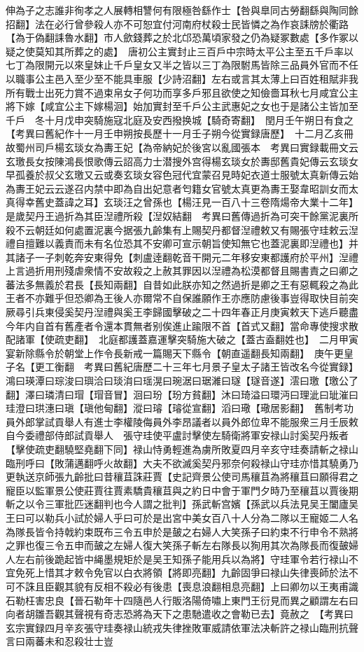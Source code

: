 伸為子之志誰非徇孝之人展轉相讐何有限極咎繇作士【咎與臯同古勞翻繇與陶同餘招翻】法在必行曾參殺人亦不可恕宜付河南府杖殺士民皆憐之為作哀誄牓於衢路【為于偽翻誄魯水翻】市人歛錢葬之於北邙恐萬頃家發之仍為疑冢數處【多作冢以疑之使莫知其所葬之的處】　唐初公主實封止三百戶中宗時太平公主至五千戶率以七丁為限開元以來皇妹止千戶皇女又半之皆以三丁為限駙馬皆除三品員外官而不任以職事公主邑入至少至不能具車服【少詩沼翻】左右或言其太薄上曰百姓租賦非我所有戰士出死力賞不過束帛女子何功而享多戶邪且欲使之知儉嗇耳秋七月咸宜公主將下嫁【咸宜公主下嫁楊洄】始加實封至千戶公主武惠妃之女也于是諸公主皆加至千戶　冬十月戊申突騎施寇北庭及安西撥换城【騎奇寄翻】　閏月壬午朔日有食之　【考異曰舊紀作十一月壬申朔按長歷十一月壬子朔今從實録唐歷】　十二月乙亥冊故蜀州司戶楊玄琰女為夀王妃【為帝納妃於後宮以亂國張本　考異曰實録載冊文云玄璬長女按陳鴻長恨歌傳云詔高力士潜搜外宫得楊玄琰女於夀邸舊貴妃傳云玄琰女早孤養於叔父玄璬又云或奏玄琰女容色冠代宜蒙召見時妃衣道士服號太真新傳云始為夀王妃云云遂召内禁中即為自出妃意者匄籍女官號太真更為夀王娶韋昭訓女而太真得幸舊史蓋諱之耳】玄琰汪之曾孫也【楊汪見一百八十三卷隋煬帝大業十二年】　是歲契丹王過折為其臣湼禮所殺【湼奴結翻　考異曰舊傳過折為可突干餘黨泥裏所殺不云朝廷如何處置泥裏今据張九齡集有上賜契丹都督湼禮敕又有賜張守珪敕云湼禮自擅難以義責而未有名位恐其不安卿可宣示朝旨使知無它也蓋泥裏即湼禮也】并其諸子一子刺乾奔安東得免【刺盧逹翻乾音干開元二年移安東都護府於平州】湼禮上言過折用刑殘虐衆情不安故殺之上赦其罪因以湼禮為松漠都督且賜書責之曰卿之蕃法多無義於君長【長知兩翻】自昔如此朕亦知之然過折是卿之王有惡輒殺之為此王者不亦難乎但恐卿為王後人亦爾常不自保誰願作王亦應防慮後事豈得取快目前突厥尋引兵東侵奚契丹湼禮與奚王李歸國擊破之二十四年春正月庚寅敕天下逃戶聽盡今年内自首有舊產者令還本貫無者别俟進止踰限不首【首式又翻】當命專使搜求散配諸軍【使疏吏翻】　北庭都護蓋嘉運擊突騎施大破之【蓋古盍翻姓也】　二月甲寅宴新除縣令於朝堂上作令長新戒一篇賜天下縣令【朝直遥翻長知兩翻】　庚午更皇子名【更工衡翻　考異曰舊紀唐歷二十三年七月景子皇太子諸王皆改名今從實録】鴻曰瑛潭曰琮浚曰璵洽曰琰㳙曰瑶滉曰琬涺曰琚濰曰璲【璲音遂】澐曰璬【璬公了翻】澤曰璘清曰瑁【瑁音冒】洄曰玢【玢方貧翻】沐曰琦溢曰環沔曰理泚曰玼漼曰珪澄曰珙潓曰瑱【瑱他甸翻】漎曰璿【璿從宣翻】滔曰璥【璥居影翻】　舊制考功員外郎掌試貢舉人有進士李權陵侮員外李昂議者以員外郎位卑不能服衆三月壬辰敕自今委禮部侍郎試貢舉人　張守珪使平盧討擊使左騎衛將軍安禄山討奚契丹叛者【擊使疏吏翻驍堅堯翻下同】禄山恃勇輕進為虜所敗夏四月辛亥守珪奏請斬之禄山臨刑呼曰【敗蒲邁翻呼火故翻】大夫不欲滅奚契丹邪奈何殺禄山守珪亦惜其驍勇乃更執送京師張九齡批曰昔穰苴誅莊賈【史記齊景公使司馬穰苴為將穰苴曰願得君之寵臣以監軍景公使莊賈往賈素驕貴穰苴與之約日中會于軍門夕時乃至穰苴以賈後期斬之以令三軍批匹迷翻判也今人謂之批判】孫武斬宫嬪【孫武以兵法見吴王闔廬吴王曰可以勒兵小試於婦人乎曰可於是出宮中美女百八十人分為二隊以王寵姬二人名為隊長皆令持戟約束既布三令五申於是皷之右婦人大笑孫子曰約束不行申令不熟將之罪也復三令五申而皷之左婦人復大笑孫子斬左右隊長以狥用其次為隊長而復皷婦人左右前後跪起皆中䋲墨規矩於是吴王知孫子能用兵以為將】守珪軍令若行禄山不宜免死上惜其才敕令免官以白衣將領【將即亮翻】九齡固爭曰禄山失律喪師於法不可不誅且臣觀其貌有反相不殺必有後患【喪息浪翻相息亮翻】上曰卿勿以王夷甫識石勒枉害忠良【晉石勒年十四隨邑人行販洛陽倚嘯上東門王衍見而異之顧謂左右曰向者胡雛吾觀其聲視有奇志恐將為天下之患馳遣收之會勒已去】竟赦之　【考異曰玄宗實録四月辛亥張守珪奏禄山統戎失律挫敗軍威請依軍法决斬許之禄山臨刑抗聲言曰兩蕃未和忍殺壮士豈
